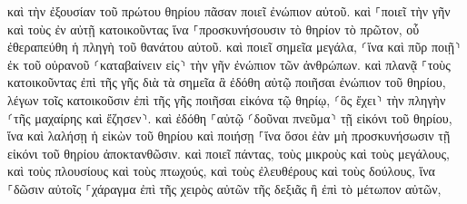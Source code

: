 \documentclass{openreader}
\begin{document}
καὶ τὴν ἐξουσίαν τοῦ πρώτου θηρίου πᾶσαν ποιεῖ ἐνώπιον αὐτοῦ. καὶ ⸀ποιεῖ τὴν γῆν καὶ τοὺς ἐν αὐτῇ κατοικοῦντας ἵνα ⸀προσκυνήσουσιν τὸ θηρίον τὸ πρῶτον, οὗ ἐθεραπεύθη ἡ πληγὴ τοῦ θανάτου αὐτοῦ. 
καὶ ποιεῖ σημεῖα μεγάλα, ⸂ἵνα καὶ πῦρ ποιῇ⸃ ἐκ τοῦ οὐρανοῦ ⸂καταβαίνειν εἰς⸃ τὴν γῆν ἐνώπιον τῶν ἀνθρώπων. 
καὶ πλανᾷ ⸀τοὺς κατοικοῦντας ἐπὶ τῆς γῆς διὰ τὰ σημεῖα ἃ ἐδόθη αὐτῷ ποιῆσαι ἐνώπιον τοῦ θηρίου, λέγων τοῖς κατοικοῦσιν ἐπὶ τῆς γῆς ποιῆσαι εἰκόνα τῷ θηρίῳ, ⸂ὃς ἔχει⸃ τὴν πληγὴν ⸂τῆς μαχαίρης καὶ ἔζησεν⸃. 
καὶ ἐδόθη ⸀αὐτῷ ⸂δοῦναι πνεῦμα⸃ τῇ εἰκόνι τοῦ θηρίου, ἵνα καὶ λαλήσῃ ἡ εἰκὼν τοῦ θηρίου καὶ ποιήσῃ ⸀ἵνα ὅσοι ἐὰν μὴ προσκυνήσωσιν τῇ εἰκόνι τοῦ θηρίου ἀποκτανθῶσιν. 
καὶ ποιεῖ πάντας, τοὺς μικροὺς καὶ τοὺς μεγάλους, καὶ τοὺς πλουσίους καὶ τοὺς πτωχούς, καὶ τοὺς ἐλευθέρους καὶ τοὺς δούλους, ἵνα ⸀δῶσιν αὐτοῖς ⸀χάραγμα ἐπὶ τῆς χειρὸς αὐτῶν τῆς δεξιᾶς ἢ ἐπὶ τὸ μέτωπον αὐτῶν, 
\end{document}
